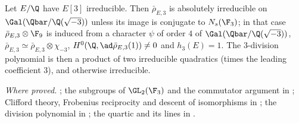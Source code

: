 \begin{sloppypar}
\begin{proposition}\label{prop:paper:ns}
Let $E/\Q$ have $E[3]$ irreducible. Then $\bar\rho_{E,3}$ is absolutely irreducible on $\Gal(\Qbar/\Q(\sqrt{-3}))$ unless its image is conjugate to $N_s(\F_3)$; in that case $\bar\rho_{E,3}\otimes\F_9$ is
induced from a character $\psi$ of order $4$ of $\Gal(\Qbar/\Q(\sqrt{-3}))$, $\bar\rho_{E,3}\simeq\bar\rho_{E,3}\otimes\chi_{-3}$, $H^0(\Q,\ad\bar\rho_{E,3}(1))\ne0$ and $h_3(E)=1$. The $3$-division polynomial is then a
product of two irreducible quadratics (times the leading coefficient $3$), and otherwise irreducible.
\end{proposition}

\noindent\emph{Where proved.} ; the subgroups of $\GL_2(\F_3)$ and the commutator argument in ; Clifford theory, Frobenius reciprocity and
descent of isomorphisms in ; the division polynomial in ; the quartic and its lines in .


\end{sloppypar}
